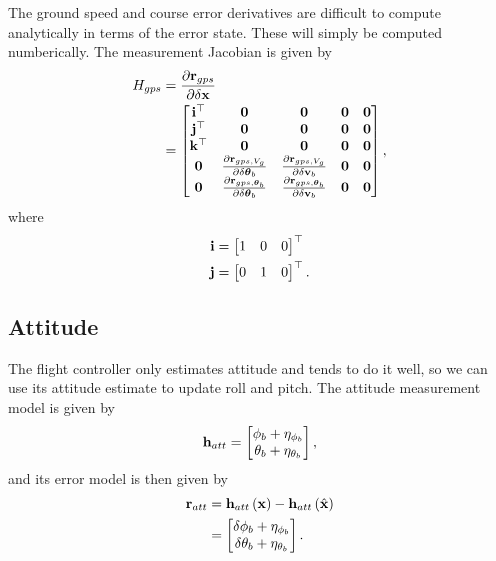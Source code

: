 \documentclass[english]{article}
\begin{document}
The ground speed and course error derivatives are difficult to compute analytically in terms of the error state. These will simply be computed numberically. The measurement Jacobian is given by
\begin{align}
H_{gps} & = \frac{\partial {\bf r}_{gps}}{\partial \delta {\bf x}} \\
& = \begin{bmatrix} {\bf i}^\top & {\bf 0} & {\bf 0} & {\bf 0} & {\bf 0} \\
{\bf j}^\top & {\bf 0} & {\bf 0} & {\bf 0} & {\bf 0} \\
{\bf k}^\top & {\bf 0} & {\bf 0} & {\bf 0} & {\bf 0} \\
{\bf 0} & \frac{\partial {\bf r}_{gps,V_g}}{\partial \delta {\boldsymbol \theta}_b} & \frac{\partial {\bf r}_{gps,V_g}}{\partial \delta {\bf v}_b} & {\bf 0} & {\bf 0} \\
{\bf 0} & \frac{\partial {\bf r}_{gps,{\boldsymbol \theta}_b}}{\partial \delta {\boldsymbol \theta}_b} & \frac{\partial {\bf r}_{gps,{\boldsymbol \theta}_b}}{\partial \delta {\bf v}_b} & {\bf 0} & {\bf 0} \end{bmatrix},
\end{align}
where
\begin{align}
{\bf i} & = \begin{bmatrix} 1 & 0 & 0 \end{bmatrix}^\top \\
{\bf j} & = \begin{bmatrix} 0 & 1 & 0 \end{bmatrix}^\top.
\end{align}

\subsection{Attitude}

The flight controller only estimates attitude and tends to do it well, so we can use its attitude estimate to update roll and pitch. The attitude measurement model is given by
\begin{equation}
{\bf h}_{att} = \begin{bmatrix} \phi_b + \eta_{\phi_b} \\ \theta_b + \eta_{\theta_b} \end{bmatrix},
\end{equation}
and its error model is then given by
\begin{align}
{\bf r}_{att} & = {\bf h}_{att}\left({\bf x}\right) - {\bf h}_{att}\left(\hat{{\bf x}}\right) \\
& = \begin{bmatrix} \delta \phi_b + \eta_{\phi_b} \\ \delta \theta_b + \eta_{\theta_b} \end{bmatrix}.
\end{align}
\end{document}
